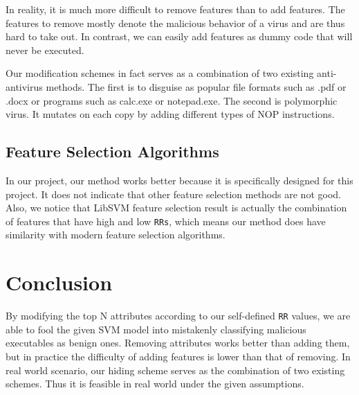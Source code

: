 \documentclass[11pt]{article}
\begin{document}
In reality, it is much more difficult to remove features than to add features. The features to remove mostly denote the malicious behavior of a virus and are thus hard to take out. In contrast, we can easily add features as dummy code that will never be executed.

Our modification schemes in fact serves as a combination of two existing anti-antivirus methods. The first is to disguise as popular file formats such as .pdf or .docx or programs such as calc.exe or notepad.exe. The second is polymorphic virus. It mutates on each copy by adding different types of NOP instructions.

\subsection{Feature Selection Algorithms}
In our project, our method works better because it is specifically designed for this project. It does not indicate that other feature selection methods are not good. Also, we notice that LibSVM feature selection result is actually the combination of features that have high and low \texttt{RRs}, which means our method does have similarity with modern feature selection algorithms.

\section{Conclusion}
By modifying the top N attributes according to our self-defined \texttt{RR} values, we are able to fool the given SVM model into mistakenly classifying malicious executables as benign ones. Removing attributes works better than adding them, but in practice the difficulty of adding features is lower than that of removing. In real world scenario, our hiding scheme serves as the combination of two existing schemes. Thus it is feasible in real world under the given assumptions.



\end{document}
